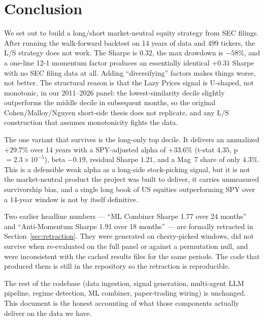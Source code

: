 \documentclass[11pt,a4paper]{article}
\begin{document}
\section{Conclusion}
\label{sec:conclusion}

We set out to build a long/short market-neutral equity strategy from SEC filings. After running the walk-forward backtest on 14 years of data and 499 tickers, the L/S strategy does not work. The Sharpe is $0.32$, the max drawdown is $-58\%$, and a one-line 12-1 momentum factor produces an essentially identical $+0.31$ Sharpe with no SEC filing data at all. Adding ``diversifying'' factors makes things worse, not better. The structural reason is that the Lazy Prices signal is U-shaped, not monotonic, in our 2011--2026 panel: the lowest-similarity decile slightly outperforms the middle decile in subsequent months, so the original Cohen/Malloy/Nguyen short-side thesis does not replicate, and any L/S construction that assumes monotonicity fights the data.

The one variant that survives is the long-only top decile. It delivers an annualized $+29.7\%$ over 14 years with a SPY-adjusted alpha of $+33.6\%$ (t-stat $4.35$, p $= 2.3 \times 10^{-5}$), beta $-0.19$, residual Sharpe $1.21$, and a Mag~7 share of only $4.3\%$. This is a defensible weak alpha as a long-side stock-picking signal, but it is not the market-neutral product the project was built to deliver, it carries unmeasured survivorship bias, and a single long book of US equities outperforming SPY over a 14-year window is not by itself definitive.

Two earlier headline numbers --- ``ML Combiner Sharpe 1.77 over 24 months'' and ``Anti-Momentum Sharpe 1.91 over 18 months'' --- are formally retracted in Section~\ref{sec:retraction}. They were generated on cherry-picked windows, did not survive when re-evaluated on the full panel or against a permutation null, and were inconsistent with the cached results files for the same periods. The code that produced them is still in the repository so the retraction is reproducible.

The rest of the codebase (data ingestion, signal generation, multi-agent LLM pipeline, regime detection, ML combiner, paper-trading wiring) is unchanged. This document is the honest accounting of what those components actually deliver on the data we have.
\end{document}
